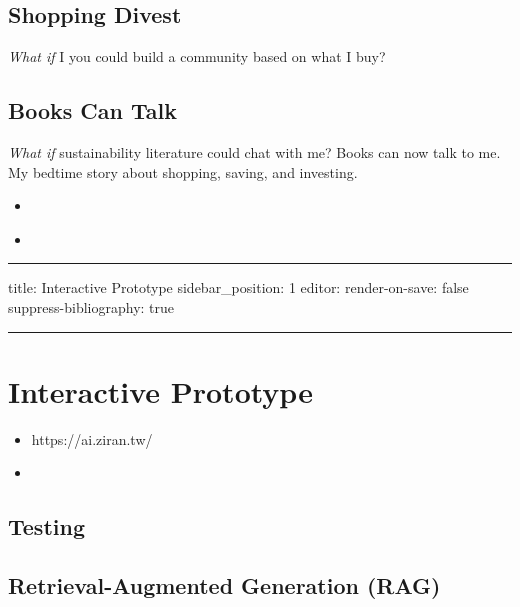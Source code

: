 \documentclass[
  letterpaper,
  DIV=11,
  numbers=noendperiod]{scrartcl}
\providecommand{\tightlist}{%
  \setlength{\itemsep}{0pt}\setlength{\parskip}{0pt}}\usepackage{longtable,booktabs,array}
\begin{document}
\subsection{Shopping Divest}\label{shopping-divest}

\emph{What if} I you could build a community based on what I buy?

\subsection{Books Can Talk}\label{books-can-talk}

\emph{What if} sustainability literature could chat with me? Books can
now talk to me. My bedtime story about shopping, saving, and investing.
\citep{SustainableShoppingSaving2023}

\begin{itemize}
\tightlist
\item
  \citep{raykurzweilIntroducingSemanticExperiences2018}
\item
  \citep{baileyAIEducation2023}
\end{itemize}

\begin{center}\rule{0.5\linewidth}{0.5pt}\end{center}

title: Interactive Prototype sidebar\_position: 1 editor:
render-on-save: false suppress-bibliography: true

\begin{center}\rule{0.5\linewidth}{0.5pt}\end{center}

\section{Interactive Prototype}\label{interactive-prototype}

\begin{itemize}
\tightlist
\item
  https://ai.ziran.tw/
\item
\end{itemize}

\subsection{Testing}\label{testing}

\subsection{Retrieval-Augmented Generation
(RAG)}\label{retrieval-augmented-generation-rag}
\end{document}
